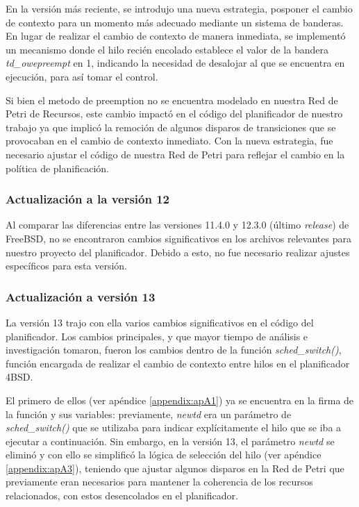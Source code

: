 En la versión más reciente, se introdujo una nueva estrategia, posponer el cambio de contexto para un momento más adecuado mediante un sistema de banderas. En lugar de realizar el cambio de contexto de manera inmediata, se implementó un mecanismo donde el hilo recién encolado establece el valor de la bandera \textit{td\_owepreempt} en 1, indicando la necesidad de desalojar al que se encuentra en ejecución, para así tomar el control.\par

Si bien el metodo de preemption no se encuentra modelado en nuestra Red de Petri de Recursos, este cambio impactó en el código del planificador de nuestro trabajo ya que implicó la remoción de algunos disparos de transiciones que se provocaban en el cambio de contexto inmediato. Con la nueva estrategia, fue necesario ajustar el código de nuestra Red de Petri para reflejar el cambio en la política de planificación.\par

\subsubsection{Actualización a la versión 12}

Al comparar las diferencias entre las versiones 11.4.0 y 12.3.0 (último \textit{release}) de FreeBSD, no se encontraron cambios significativos en los archivos relevantes para nuestro proyecto del planificador. Debido a esto, no fue necesario realizar ajustes específicos para esta versión.


\subsubsection{Actualización a versión 13}

La versión 13 trajo con ella varios cambios significativos en el código del planificador. Los cambios principales, y que mayor tiempo de análisis e investigación tomaron, fueron los cambios dentro de la función \textit{sched\_switch()}, función encargada de realizar el cambio de contexto entre hilos en el planificador 4BSD.\par

El primero de ellos (ver apéndice \ref{appendix:apA1}) ya se encuentra en la firma de la función y sus variables: previamente, \textit{newtd} era un parámetro de \textit{sched\_switch()} que se utilizaba para indicar explícitamente el hilo que se iba a ejecutar a continuación. Sin embargo, en la versión 13, el parámetro \textit{newtd} se eliminó y con ello se simplificó la lógica de selección del hilo (ver apéndice \ref{appendix:apA3}), teniendo que ajustar algunos disparos en la Red de Petri que previamente eran necesarios para mantener la coherencia de los recursos relacionados, con estos desencolados en el planificador.\par

